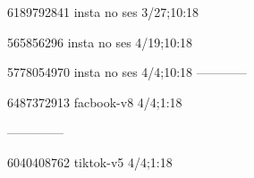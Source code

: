 6189792841 insta no ses
3/27;10:18

565856296 insta no ses
4/19;10:18

5778054970 insta no ses
4/4;10:18
------------

6487372913 facbook-v8
4/4;1:18


--------------

6040408762 tiktok-v5
4/4;1:18
